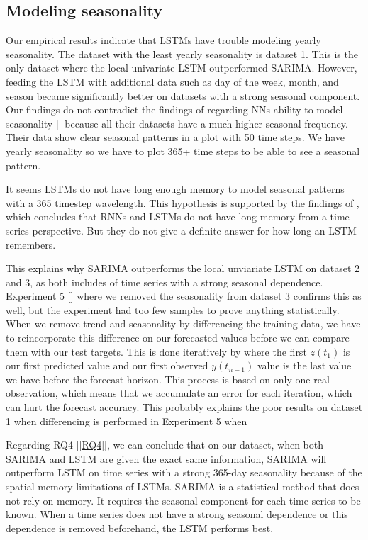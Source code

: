 
\subsection{Modeling seasonality}
Our empirical results indicate that LSTMs have trouble modeling yearly seasonality.
The dataset with the least yearly seasonality is dataset 1. This is the only dataset where
the local univariate LSTM outperformed SARIMA. However, feeding the LSTM with additional
data such as day of the week, month, and season became significantly better on datasets
with a strong seasonal component.
Our findings do not contradict the findings of \cite{Hewamalage2021} regarding NNs ability
to model seasonality []
because all their datasets have a much higher seasonal frequency. Their
data show clear seasonal patterns in a plot with 50 time steps. We have yearly seasonality
so we have to plot 365+ time steps to be able to see a seasonal pattern.

It seems LSTMs do not have long enough memory to model seasonal patterns
with a 365 timestep wavelength.
This hypothesis is supported by the findings of \cite{Zhao2020}, which concludes that
RNNs and LSTMs do not have long memory from a time series perspective.
But they do not give a definite answer for how long an LSTM remembers.

This explains why SARIMA outperforms the local unviariate LSTM on dataset 2 and 3, as both includes
of time series with a strong seasonal dependence.
Experiment 5 [] where we removed
the seasonality from dataset 3 confirms this as well, but the experiment had too few samples
to prove anything statistically. When we remove trend and seasonality by differencing the training data,
we have to reincorporate this difference on our forecasted values before we can compare them with our
test targets. This is done iteratively by  where the first
$z(t_1)$ is our first predicted value and our first observed $y(t_{n-1})$ value is the last value
we have before the forecast horizon. This process is based on only one real observation, which means
that we accumulate an error for each iteration, which can hurt the forecast accuracy.
This probably explains the poor results on dataset 1 when differencing is performed in Experiment 5 when

Regarding RQ4 [\ref{RQ4}], we can conclude that on our dataset, when
both SARIMA and LSTM are given the exact same information, SARIMA will outperform
LSTM on time series with a strong 365-day seasonality because of the spatial memory limitations
of LSTMs.
SARIMA is a statistical method that does not rely on memory.
It requires the seasonal component for each time series to be known.
When a time series does not have a strong seasonal dependence or this
dependence is removed beforehand, the LSTM performs best.

